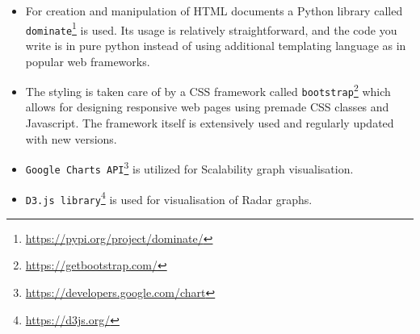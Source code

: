 \begin{itemize}
    \item For creation and manipulation of HTML documents a Python library called \texttt{dominate}\footnote{\url{https://pypi.org/project/dominate/}} is used. Its usage is relatively straightforward, and the code you write is in pure python instead of using additional templating language as in popular web frameworks.
    \item The styling is taken care of by a CSS framework called \texttt{bootstrap}\footnote{\url{https://getbootstrap.com/}} which allows for designing responsive web pages using premade CSS classes and Javascript. The framework itself is extensively used and regularly updated with new versions.
    \item \texttt{Google Charts API}\footnote{\url{https://developers.google.com/chart}}  is utilized for Scalability graph visualisation.
    \item \texttt{D3.js library}\footnote{\url{https://d3js.org/}}  is used for visualisation of Radar graphs.
\end{itemize}

